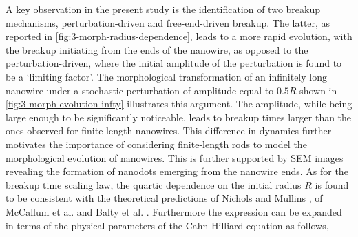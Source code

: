 A key observation in the present study is the identification of two breakup mechanisms, perturbation-driven and free-end-driven breakup. The latter, as reported in \autoref{fig:3-morph-radius-dependence}, leads to a more rapid evolution, with the breakup initiating from the ends of the nanowire, as opposed to the perturbation-driven, where the initial amplitude of the perturbation is found to be a `limiting factor'. The morphological transformation of an infinitely long nanowire under a stochastic perturbation of amplitude equal to $0.5R$ shown in \autoref{fig:3-morph-evolution-infty} illustrates this argument. The amplitude, while being large enough to be significantly noticeable, leads to breakup times larger than the ones observed for finite length nanowires. This difference in dynamics further motivates the importance of considering finite-length rods to model the morphological evolution of nanowires. This is further supported by SEM images revealing the formation of nanodots emerging from the nanowire ends.
As for the breakup time scaling law, the quartic dependence on the initial radius $R$ is found to be consistent with the theoretical predictions of Nichols and Mullins \cite{NicholsMullins1965,Nichols1976}, of McCallum et al. \cite{McCallumVoorheesMiksisDavisWong1996} and Balty et al. \cite{BaltyBaretSilhanekNguyen2024}. Furthermore the expression can be expanded in terms of the physical parameters of the Cahn-Hilliard equation as follows,
